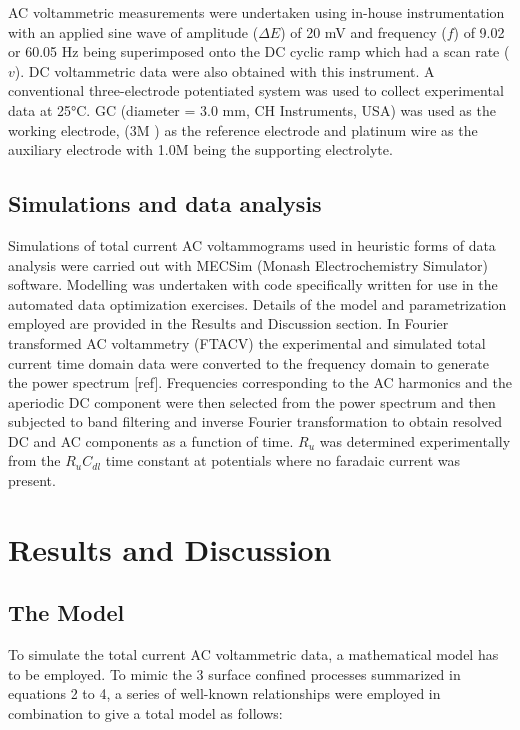 \documentclass[a4paper, 12pt]{article}
\begin{document}
AC voltammetric measurements were undertaken using in-house instrumentation with 
an applied sine wave of amplitude ($\Delta E$) of 20 mV and frequency ($f$) of 
9.02 or 60.05 Hz being superimposed onto the DC cyclic ramp which had a scan 
rate ($v$).   DC voltammetric data were also obtained with this instrument. A 
conventional three-electrode potentiated system was used to collect experimental 
data at 25°C.  GC (diameter = 3.0 mm, CH Instruments, USA) was used as the 
working electrode,
 (3M ) as the reference electrode and platinum wire as the 
auxiliary electrode with 1.0M  being the supporting electrolyte.

\subsection{Simulations and data analysis}

Simulations of total current AC voltammograms used in heuristic forms of data 
analysis were carried out with MECSim (Monash Electrochemistry Simulator) 
software. Modelling was undertaken with code specifically written for use in the 
automated data optimization exercises. Details of the model and parametrization 
employed are provided in the Results and Discussion section.  In Fourier 
transformed  AC voltammetry (FTACV) the experimental and simulated total current 
time domain data were converted to the frequency domain to generate the power 
spectrum [ref]. Frequencies corresponding to the AC harmonics and the aperiodic 
DC component were then selected from the power spectrum and then subjected to 
band filtering and inverse Fourier transformation to obtain resolved DC and AC 
components as a function of time. $R_u$ was determined experimentally from the 
$R_u C_{dl}$ time constant at potentials where no faradaic current was present.

\section{Results and Discussion}

\subsection{The Model}\label{sec:model}

To simulate the total current AC voltammetric data, a mathematical model has to 
be employed. To mimic the 3 surface confined processes summarized in equations 2 
to 4, a series of well-known relationships were employed in combination to give 
a total model as follows:
\end{document}
